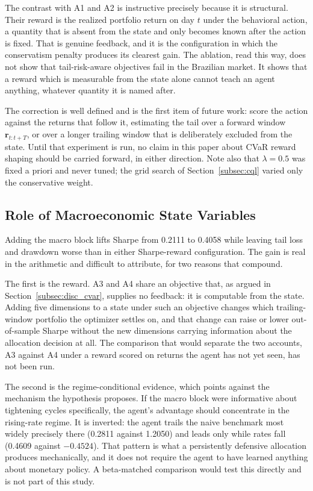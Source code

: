 The contrast with A1 and A2 is instructive precisely because it is structural.
Their reward is the realized portfolio return on day $t$ under the behavioral
action, a quantity that is absent from the state and only becomes known after the
action is fixed.
That is genuine feedback, and it is the configuration in which the conservatism
penalty produces its clearest gain.
The ablation, read this way, does not show that tail-risk-aware objectives fail in
the Brazilian market.
It shows that a reward which is measurable from the state alone cannot teach an
agent anything, whatever quantity it is named after.

The correction is well defined and is the first item of future work: score the
action against the returns that follow it, estimating the tail over a forward
window $\mathbf{r}_{t:t+T}$, or over a longer trailing window that is deliberately
excluded from the state.
Until that experiment is run, no claim in this paper about CVaR reward shaping
should be carried forward, in either direction.
Note also that $\lambda = 0.5$ was fixed a priori and never tuned; the grid search
of Section~\ref{subsec:cql} varied only the conservative weight.

\subsection{Role of Macroeconomic State Variables}
\label{subsec:disc_macro}

Adding the macro block lifts Sharpe from 0.2111 to 0.4058 while leaving tail loss
and drawdown worse than in either Sharpe-reward configuration.
The gain is real in the arithmetic and difficult to attribute, for two reasons that
compound.

The first is the reward.
A3 and A4 share an objective that, as argued in Section~\ref{subsec:disc_cvar},
supplies no feedback: it is computable from the state.
Adding five dimensions to a state under such an objective changes which
trailing-window portfolio the optimizer settles on, and that change can raise or
lower out-of-sample Sharpe without the new dimensions carrying information about
the allocation decision at all.
The comparison that would separate the two accounts, A3 against A4 under a reward
scored on returns the agent has not yet seen, has not been run.

The second is the regime-conditional evidence, which points against the mechanism
the hypothesis proposes.
If the macro block were informative about tightening cycles specifically, the
agent's advantage should concentrate in the rising-rate regime.
It is inverted: the agent trails the naive benchmark most widely precisely there
(0.2811 against 1.2050) and leads only while rates fall (0.4609 against
$-0.4524$).
That pattern is what a persistently defensive allocation produces mechanically,
and it does not require the agent to have learned anything about monetary policy.
A beta-matched comparison would test this directly and is not part of this study.

